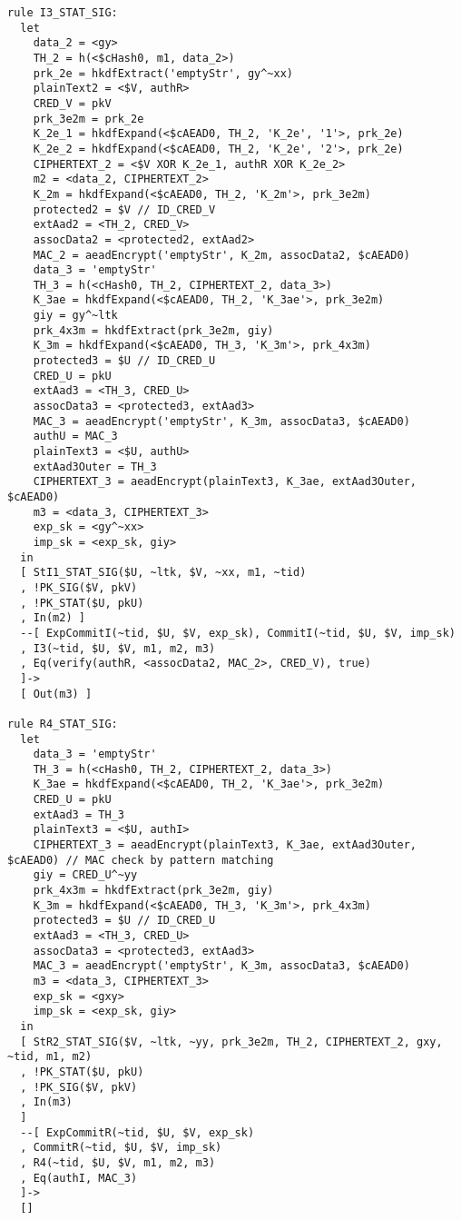 \begin{lstlisting}
rule I3_STAT_SIG:
  let
    data_2 = <gy> 
    TH_2 = h(<$cHash0, m1, data_2>)
    prk_2e = hkdfExtract('emptyStr', gy^~xx)
    plainText2 = <$V, authR> 
    CRED_V = pkV
    prk_3e2m = prk_2e
    K_2e_1 = hkdfExpand(<$cAEAD0, TH_2, 'K_2e', '1'>, prk_2e)
    K_2e_2 = hkdfExpand(<$cAEAD0, TH_2, 'K_2e', '2'>, prk_2e)
    CIPHERTEXT_2 = <$V XOR K_2e_1, authR XOR K_2e_2> 
    m2 = <data_2, CIPHERTEXT_2>
    K_2m = hkdfExpand(<$cAEAD0, TH_2, 'K_2m'>, prk_3e2m)
    protected2 = $V // ID_CRED_V
    extAad2 = <TH_2, CRED_V> 
    assocData2 = <protected2, extAad2>
    MAC_2 = aeadEncrypt('emptyStr', K_2m, assocData2, $cAEAD0)
    data_3 = 'emptyStr' 
    TH_3 = h(<cHash0, TH_2, CIPHERTEXT_2, data_3>)
    K_3ae = hkdfExpand(<$cAEAD0, TH_2, 'K_3ae'>, prk_3e2m)
    giy = gy^~ltk
    prk_4x3m = hkdfExtract(prk_3e2m, giy)
    K_3m = hkdfExpand(<$cAEAD0, TH_3, 'K_3m'>, prk_4x3m)
    protected3 = $U // ID_CRED_U
    CRED_U = pkU
    extAad3 = <TH_3, CRED_U>
    assocData3 = <protected3, extAad3>
    MAC_3 = aeadEncrypt('emptyStr', K_3m, assocData3, $cAEAD0)
    authU = MAC_3
    plainText3 = <$U, authU>
    extAad3Outer = TH_3
    CIPHERTEXT_3 = aeadEncrypt(plainText3, K_3ae, extAad3Outer, $cAEAD0)
    m3 = <data_3, CIPHERTEXT_3>
    exp_sk = <gy^~xx>
    imp_sk = <exp_sk, giy>
  in
  [ StI1_STAT_SIG($U, ~ltk, $V, ~xx, m1, ~tid) 
  , !PK_SIG($V, pkV)
  , !PK_STAT($U, pkU)
  , In(m2) ]
  --[ ExpCommitI(~tid, $U, $V, exp_sk), CommitI(~tid, $U, $V, imp_sk)
  , I3(~tid, $U, $V, m1, m2, m3)
  , Eq(verify(authR, <assocData2, MAC_2>, CRED_V), true)
  ]->
  [ Out(m3) ]

rule R4_STAT_SIG:
  let
    data_3 = 'emptyStr'
    TH_3 = h(<cHash0, TH_2, CIPHERTEXT_2, data_3>)
    K_3ae = hkdfExpand(<$cAEAD0, TH_2, 'K_3ae'>, prk_3e2m)
    CRED_U = pkU
    extAad3 = TH_3
    plainText3 = <$U, authI>
    CIPHERTEXT_3 = aeadEncrypt(plainText3, K_3ae, extAad3Outer, $cAEAD0) // MAC check by pattern matching
    giy = CRED_U^~yy
    prk_4x3m = hkdfExtract(prk_3e2m, giy)
    K_3m = hkdfExpand(<$cAEAD0, TH_3, 'K_3m'>, prk_4x3m)
    protected3 = $U // ID_CRED_U
    extAad3 = <TH_3, CRED_U>
    assocData3 = <protected3, extAad3>
    MAC_3 = aeadEncrypt('emptyStr', K_3m, assocData3, $cAEAD0)
    m3 = <data_3, CIPHERTEXT_3>
    exp_sk = <gxy>
    imp_sk = <exp_sk, giy>
  in
  [ StR2_STAT_SIG($V, ~ltk, ~yy, prk_3e2m, TH_2, CIPHERTEXT_2, gxy, ~tid, m1, m2) 
  , !PK_STAT($U, pkU)
  , !PK_SIG($V, pkV)
  , In(m3)
  ]
  --[ ExpCommitR(~tid, $U, $V, exp_sk)
  , CommitR(~tid, $U, $V, imp_sk)
  , R4(~tid, $U, $V, m1, m2, m3)
  , Eq(authI, MAC_3)
  ]->
  []
\end{lstlisting}


